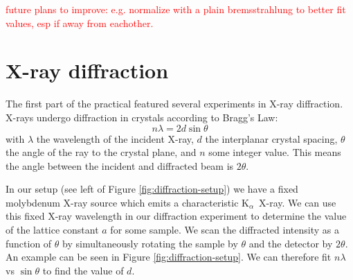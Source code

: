 \documentclass[11pt,a4paper,twoside,onecolumn]{article}
\newcommand{\reminder}[1]{\textcolor{red}{#1}}
\newcommand{\Kalpha}{$\mathrm{K}_\alpha$~}
\begin{document}
\reminder{future plans to improve: e.g. normalize with a plain bremsstrahlung to better fit values, esp if away from eachother.}

\printbibliography

\newpage
\appendix
\renewcommand\thesection{Appendix \Alph{section}}
\renewcommand{\thetable}{\Alph{section}\arabic{table}}
\setcounter{table}{0}
\renewcommand{\thefigure}{\Alph{section}\arabic{figure}}
\setcounter{figure}{0}
\renewcommand{\sectionmark}[1]{\markboth{\thesection.\ #1}{}}

\section{X-ray diffraction}\label{sec:diffraction-experiment}
The first part of the practical featured several experiments in X-ray diffraction. X-rays undergo diffraction in crystals according to Bragg's Law:
\begin{equation}
    n \lambda = 2 d \sin \theta
\end{equation}
with $\lambda$ the wavelength of the incident X-ray, $d$ the interplanar crystal spacing, $\theta$ the angle of the ray to the crystal plane, and $n$ some integer value. This means the angle between the incident and diffracted beam is $2 \theta$.

In our setup (see left of Figure \ref{fig:diffraction-setup}) we have a fixed molybdenum X-ray source which emits a characteristic \Kalpha X-ray. We can use this fixed X-ray wavelength in our diffraction experiment to determine the value of the lattice constant $a$ for some sample. We scan the diffracted intensity as a function of $\theta$ by simultaneously rotating the sample by $\theta$ and the detector by $2\theta$. An example can be seen in Figure \ref{fig:diffraction-setup}. We can therefore fit $n \lambda$ vs $\sin \theta$ to find the value of $d$.
\end{document}

